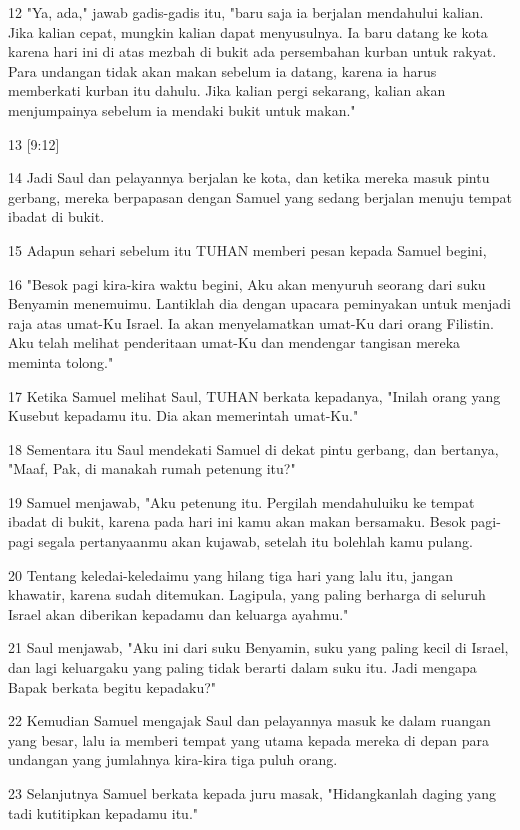\par 12 "Ya, ada," jawab gadis-gadis itu, "baru saja ia berjalan mendahului kalian. Jika kalian cepat, mungkin kalian dapat menyusulnya. Ia baru datang ke kota karena hari ini di atas mezbah di bukit ada persembahan kurban untuk rakyat. Para undangan tidak akan makan sebelum ia datang, karena ia harus memberkati kurban itu dahulu. Jika kalian pergi sekarang, kalian akan menjumpainya sebelum ia mendaki bukit untuk makan."
\par 13 [9:12]
\par 14 Jadi Saul dan pelayannya berjalan ke kota, dan ketika mereka masuk pintu gerbang, mereka berpapasan dengan Samuel yang sedang berjalan menuju tempat ibadat di bukit.
\par 15 Adapun sehari sebelum itu TUHAN memberi pesan kepada Samuel begini,
\par 16 "Besok pagi kira-kira waktu begini, Aku akan menyuruh seorang dari suku Benyamin menemuimu. Lantiklah dia dengan upacara peminyakan untuk menjadi raja atas umat-Ku Israel. Ia akan menyelamatkan umat-Ku dari orang Filistin. Aku telah melihat penderitaan umat-Ku dan mendengar tangisan mereka meminta tolong."
\par 17 Ketika Samuel melihat Saul, TUHAN berkata kepadanya, "Inilah orang yang Kusebut kepadamu itu. Dia akan memerintah umat-Ku."
\par 18 Sementara itu Saul mendekati Samuel di dekat pintu gerbang, dan bertanya, "Maaf, Pak, di manakah rumah petenung itu?"
\par 19 Samuel menjawab, "Aku petenung itu. Pergilah mendahuluiku ke tempat ibadat di bukit, karena pada hari ini kamu akan makan bersamaku. Besok pagi-pagi segala pertanyaanmu akan kujawab, setelah itu bolehlah kamu pulang.
\par 20 Tentang keledai-keledaimu yang hilang tiga hari yang lalu itu, jangan khawatir, karena sudah ditemukan. Lagipula, yang paling berharga di seluruh Israel akan diberikan kepadamu dan keluarga ayahmu."
\par 21 Saul menjawab, "Aku ini dari suku Benyamin, suku yang paling kecil di Israel, dan lagi keluargaku yang paling tidak berarti dalam suku itu. Jadi mengapa Bapak berkata begitu kepadaku?"
\par 22 Kemudian Samuel mengajak Saul dan pelayannya masuk ke dalam ruangan yang besar, lalu ia memberi tempat yang utama kepada mereka di depan para undangan yang jumlahnya kira-kira tiga puluh orang.
\par 23 Selanjutnya Samuel berkata kepada juru masak, "Hidangkanlah daging yang tadi kutitipkan kepadamu itu."
